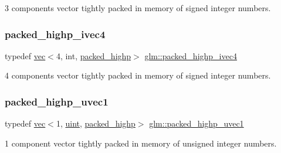 3 components vector tightly packed in memory of signed integer numbers. 

\mbox{\label{group__gtc__type__aligned_gabf988b7dc66612bc1d4c9ce44d5b5642}} 
\subsubsection{\texorpdfstring{packed\+\_\+highp\+\_\+ivec4}{packed\_highp\_ivec4}}
{\footnotesize\ttfamily typedef \hyperlink{structglm_1_1vec}{vec}$<$4, int, \hyperlink{namespaceglm_a36ed105b07c7746804d7fdc7cc90ff25a8e8791ee77fe079b1291f710d88031bf}{packed\+\_\+highp}$>$ \hyperlink{group__gtc__type__aligned_gabf988b7dc66612bc1d4c9ce44d5b5642}{glm\+::packed\+\_\+highp\+\_\+ivec4}}



4 components vector tightly packed in memory of signed integer numbers. 

\mbox{\label{group__gtc__type__aligned_ga160352f526bef94d143ccb525095936e}} 
\subsubsection{\texorpdfstring{packed\+\_\+highp\+\_\+uvec1}{packed\_highp\_uvec1}}
{\footnotesize\ttfamily typedef \hyperlink{structglm_1_1vec}{vec}$<$1, \hyperlink{group__core__precision_ga4fd29415871152bfb5abd588334147c8}{uint}, \hyperlink{namespaceglm_a36ed105b07c7746804d7fdc7cc90ff25a8e8791ee77fe079b1291f710d88031bf}{packed\+\_\+highp}$>$ \hyperlink{group__gtc__type__aligned_ga160352f526bef94d143ccb525095936e}{glm\+::packed\+\_\+highp\+\_\+uvec1}}



1 component vector tightly packed in memory of unsigned integer numbers. 

